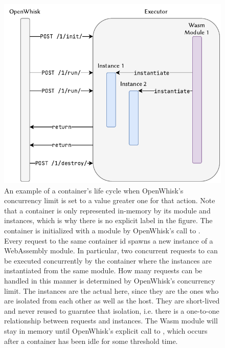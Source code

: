 \begin{figure}
    \includegraphics{figures/OpenWhiskConcurrencyLimitGreaterOne.pdf}
    \caption{An example of a container's life cycle when OpenWhisk's concurrency limit is set to a value greater one for that action. Note that a container is only represented in-memory by its module and instances, which is why there is no explicit  label in the figure. The container is initialized with a module by OpenWhisk's call to . Every  request to the same container id spawns a new instance of a WebAssembly module. In particular, two concurrent requests to  can be executed concurrently by the container where the instances are instantiated from the same module. How many requests can be handled in this manner is determined by OpenWhisk's concurrency limit. The instances are the actual  here, since they are the ones who are isolated from each other as well as the host. They are short-lived and never reused to guarntee that isolation, i.e. there is a one-to-one relationship between  requests and instances. The Wasm module will stay in memory until OpenWhisk's explicit call to , which occurs after a container has been idle for some threshold time.}
    \label{fig:openwhisk-concurrency-limit-greater-one}
\end{figure}


